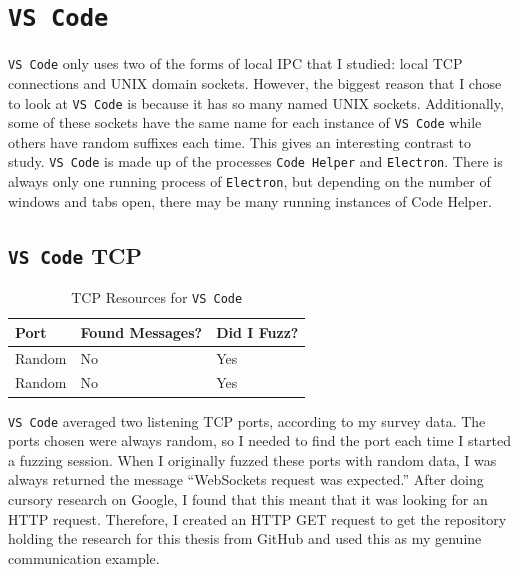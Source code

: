 \section{\texttt{VS Code}}
\label{sec:code}
\texttt{VS Code} only uses two of the forms of local IPC that I studied: local TCP connections and UNIX domain sockets.  However, the biggest reason that I chose to look at \texttt{VS Code} is because it has so many named UNIX sockets.  Additionally, some of these sockets have the same name for each instance of \texttt{VS Code} while others have random suffixes each time.  This gives an interesting contrast to study.  \texttt{VS Code} is made up of the processes \texttt{Code Helper} and \texttt{Electron}.  There is always only one running process of \texttt{Electron}, but depending on the number of windows and tabs open, there may be many running instances of Code Helper.

\subsection{\texttt{VS Code} TCP}
\label{sec:codeTcp}

\begin{table}
\centering
\begin{normalsize}
\begin{tabular}{ l | l | l }
\textbf{Port} & \textbf{Found Messages?} & \textbf{Did I Fuzz?} \\ \hline
Random & No & Yes \\ \hline
Random & No & Yes \\ \hline
\end{tabular}
\caption{TCP Resources for \texttt{VS Code}}
\label{tab:vsCodeTcpTab}
\end{normalsize}
\end{table}

\texttt{VS Code} averaged two listening TCP ports, according to my survey data.  The ports chosen were always random, so I needed to find the port each time I started a fuzzing session.  When I originally fuzzed these ports with random data, I was always returned the message ``WebSockets request was expected.''  After doing cursory research on Google, I found that this meant that it was looking for an HTTP request.  Therefore, I created an HTTP GET request to get the repository holding the research for this thesis from GitHub and used this as my genuine communication example.

